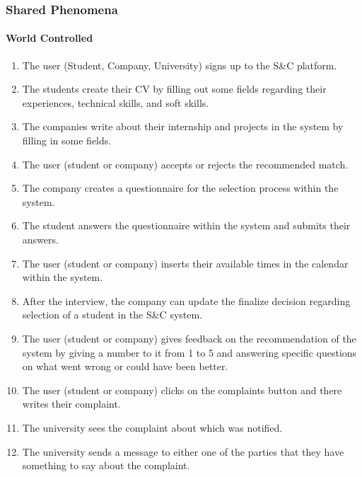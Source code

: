 \subsubsection{Shared Phenomena}
\paragraph{World Controlled}
\begin{enumerate}[label=SP{\arabic*}]
\item
The user (Student, Company, University) signs up to the S\&C platform.
\item
The students create their CV by filling out some fields regarding their experiences, technical skills, and soft skills.
\item
The companies write about their internship and projects in the system by filling in some fields.
\item
The user (student or company) accepts or rejects the recommended match.
\item
The company creates a questionnaire for the selection process within the system.
\item
The student answers the questionnaire within the system and submits their answers.
\item
The user (student or company) inserts their available times in the calendar within the system.
\item
After the interview, the company can update the finalize decision regarding selection of a student in the S\&C system.
\item
The user (student or company) gives feedback on the recommendation of the system by giving a number to it from 1 to 5 and answering specific questions on what went wrong or could have been better.
\item
The user (student or company) clicks on the complaints button and there writes their complaint. 
\item 
The university sees the complaint about which was notified. 
\item
The university sends a message to either one of the parties that they have something to say about the complaint.
\end{enumerate}

